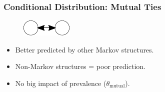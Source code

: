 \documentclass[aspectratio=169, 9pt, handout]{beamer}
\begin{document}
\begin{frame}[c,label=conditional-mutual]
	\frametitle{Conditional Distribution: Mutual Ties}
	\begin{minipage}[b]{.23\linewidth}
		\begin{figure}
			\includegraphics[width=.3\linewidth]{mutual.pdf}
		\end{figure}
		\small
		\begin{itemize}[<+->]
			\item Better predicted by other Markov structures.
			\item Non-Markov structures = poor prediction.
			\item No big impact of prevalence ($\theta_{\mbox{mutual}}$).
		\end{itemize}
	\end{minipage}
	\begin{minipage}[b]{.75\linewidth}
		\begin{figure}
			\centering
			\def\svgwidth{.95\linewidth}
		\end{figure}
	\end{minipage}
	\vfill\hfill
	\hyperlink{conditional-transitivity}{}
\end{frame}
\end{document}
